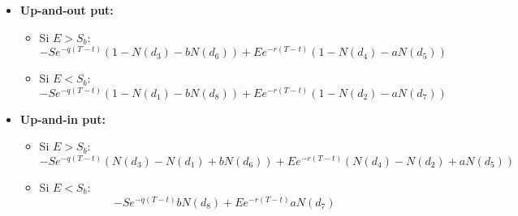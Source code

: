 \begin{itemize}
\[{        }
    \]
    \item \textbf{Up-and-out put:}
    \begin{itemize}
        \item Si $E > S_b$:
        \[
            \boxed{
                -Se^{-q(T-t)} \left( 1 - N(d_3) - bN(d_6) \right)
                + Ee^{-r(T-t)} \left( 1 - N(d_4) - aN(d_5) \right)
            }
        \]
        \item Si $E < S_b$:
        \[
            \boxed{
                -Se^{-q(T-t)} \left( 1 - N(d_1) - bN(d_8) \right)
                + Ee^{-r(T-t)} \left( 1 - N(d_2) - aN(d_7) \right)
            }
        \]
    \end{itemize}
    \item \textbf{Up-and-in put:}
    \begin{itemize}
        \item Si $E > S_b$:
        \[
            \boxed{
                -Se^{-q(T-t)} \left( N(d_3) - N(d_1) + bN(d_6) \right)
                + Ee^{-r(T-t)} \left( N(d_4) - N(d_2) + aN(d_5) \right)
            }
        \]
        \item Si $E < S_b$:
        \[
            \boxed{
                -Se^{-q(T-t)} b N(d_8) + Ee^{-r(T-t)} a N(d_7)
            }
        \]
    \end{itemize}
\end{itemize}








